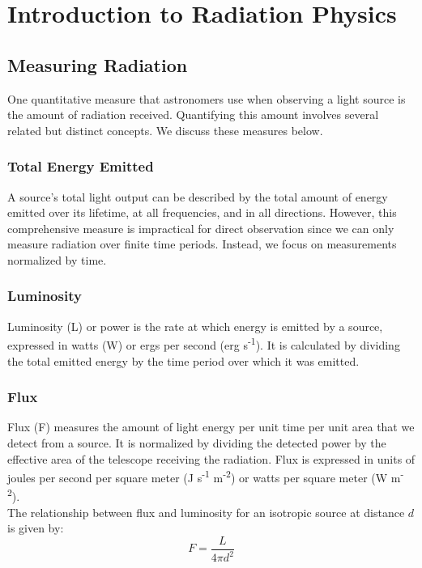 \chapter{Introduction to Radiation Physics}

\section{Measuring Radiation}

One quantitative measure that astronomers use when observing a light source is the amount of radiation received. Quantifying this amount involves several related but distinct concepts. We discuss these measures below.

\subsection{Total Energy Emitted}

A source's total light output can be described by the total amount of energy emitted over its lifetime, at all frequencies, and in all directions. However, this comprehensive measure is impractical for direct observation since we can only measure radiation over finite time periods. Instead, we focus on measurements normalized by time.

\subsection{Luminosity}

Luminosity (L) or power is the rate at which energy is emitted by a source, expressed in watts (W) or ergs per second (erg s\textsuperscript{-1}). It is calculated by dividing the total emitted energy by the time period over which it was emitted.

\subsection{Flux}

Flux (F) measures the amount of light energy per unit time per unit area that we detect from a source. It is normalized by dividing the detected power by the effective area of the telescope receiving the radiation. Flux is expressed in units of joules per second per square meter (J s\textsuperscript{-1} m\textsuperscript{-2}) or watts per square meter (W m\textsuperscript{-2}). \\

The relationship between flux and luminosity for an isotropic source at distance \( d \) is given by:
\[ F = \frac{L}{4 \pi d^2} \]

